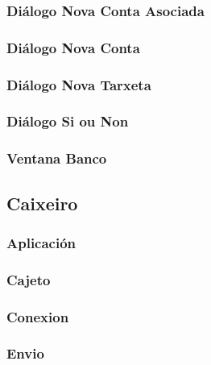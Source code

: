 \documentclass[a4paper,titlepage]{article}
\begin{document}
\subsubsection{Diálogo Nova Conta Asociada}

\subsubsection{Diálogo Nova Conta}

\subsubsection{Diálogo Nova Tarxeta}

\subsubsection{Diálogo Si ou Non}

\subsubsection{Ventana Banco}



\subsection{Caixeiro}
\subsubsection{Aplicación}

\subsubsection{Cajeto}

\subsubsection{Conexion}

\subsubsection{Envio}

\end{document}
